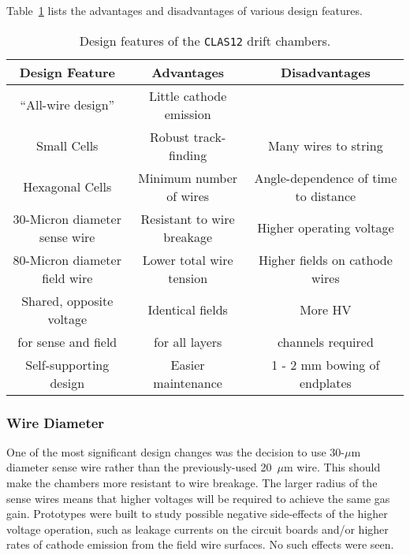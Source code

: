 Table~\ref{fwd-dc-design-features} lists the advantages and disadvantages
of various design features.
\begin{table}[ht]
\begin{center}
\begin{tabular} {||c|c|c||} \hline \hline
{\bf Design Feature  }       &{\bf Advantages} &{\bf Disadvantages}\\ \hline
``All-wire design'' & Little cathode emission & \\ \hline
Small Cells & Robust track-finding  & Many wires to string \\ \hline
Hexagonal Cells & Minimum number of wires  & Angle-dependence of time to distance  \\ \hline
30-Micron diameter sense wire & Resistant to wire breakage & Higher operating voltage \\ \hline
80-Micron diameter field wire & Lower total wire tension & Higher fields on cathode wires \\ \hline
Shared, opposite voltage  & Identical fields & More HV \\
for sense and field & for all layers & channels required \\ \hline
Self-supporting design & Easier maintenance & 1 - 2 mm bowing of endplates \\ \hline
\end{tabular}
\caption{\small{Design features of the {\tt CLAS12} drift chambers.}}
\label{fwd-dc-design-features}
\end{center}
\end{table}

\subsubsection{Wire Diameter}
One of the most significant design changes was the decision 
to use 30-$\mu$m diameter sense wire rather than the previously-used 
20~$\mu$m wire. 
This should make the chambers more resistant to wire 
breakage.  The larger radius of the sense wires means that higher 
voltages will be required to achieve the same gas gain.
Prototypes were built to study possible negative side-effects of the 
higher voltage operation, such as leakage currents on the circuit boards 
and/or higher rates of cathode emission from the field wire surfaces.
No such effects were seen.

